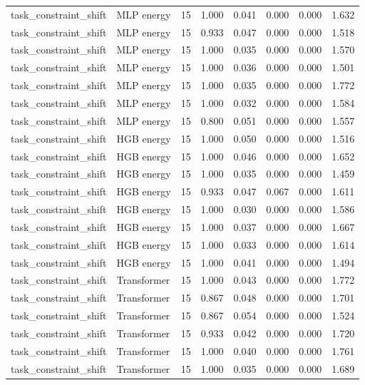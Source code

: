 {\begin{longtable}{llrrrrrr}
task\_constraint\_shift & MLP energy & 15 & 1.000 & 0.041 & 0.000 & 0.000 & 1.632 \\
task\_constraint\_shift & MLP energy & 15 & 0.933 & 0.047 & 0.000 & 0.000 & 1.518 \\
task\_constraint\_shift & MLP energy & 15 & 1.000 & 0.035 & 0.000 & 0.000 & 1.570 \\
task\_constraint\_shift & MLP energy & 15 & 1.000 & 0.036 & 0.000 & 0.000 & 1.501 \\
task\_constraint\_shift & MLP energy & 15 & 1.000 & 0.035 & 0.000 & 0.000 & 1.772 \\
task\_constraint\_shift & MLP energy & 15 & 1.000 & 0.032 & 0.000 & 0.000 & 1.584 \\
task\_constraint\_shift & MLP energy & 15 & 0.800 & 0.051 & 0.000 & 0.000 & 1.557 \\
task\_constraint\_shift & HGB energy & 15 & 1.000 & 0.050 & 0.000 & 0.000 & 1.516 \\
task\_constraint\_shift & HGB energy & 15 & 1.000 & 0.046 & 0.000 & 0.000 & 1.652 \\
task\_constraint\_shift & HGB energy & 15 & 1.000 & 0.035 & 0.000 & 0.000 & 1.459 \\
task\_constraint\_shift & HGB energy & 15 & 0.933 & 0.047 & 0.067 & 0.000 & 1.611 \\
task\_constraint\_shift & HGB energy & 15 & 1.000 & 0.030 & 0.000 & 0.000 & 1.586 \\
task\_constraint\_shift & HGB energy & 15 & 1.000 & 0.037 & 0.000 & 0.000 & 1.667 \\
task\_constraint\_shift & HGB energy & 15 & 1.000 & 0.033 & 0.000 & 0.000 & 1.614 \\
task\_constraint\_shift & HGB energy & 15 & 1.000 & 0.041 & 0.000 & 0.000 & 1.494 \\
task\_constraint\_shift & Transformer & 15 & 1.000 & 0.043 & 0.000 & 0.000 & 1.772 \\
task\_constraint\_shift & Transformer & 15 & 0.867 & 0.048 & 0.000 & 0.000 & 1.701 \\
task\_constraint\_shift & Transformer & 15 & 0.867 & 0.054 & 0.000 & 0.000 & 1.524 \\
task\_constraint\_shift & Transformer & 15 & 0.933 & 0.042 & 0.000 & 0.000 & 1.720 \\
task\_constraint\_shift & Transformer & 15 & 1.000 & 0.040 & 0.000 & 0.000 & 1.761 \\
task\_constraint\_shift & Transformer & 15 & 1.000 & 0.035 & 0.000 & 0.000 & 1.689 \\

\end{longtable}}
